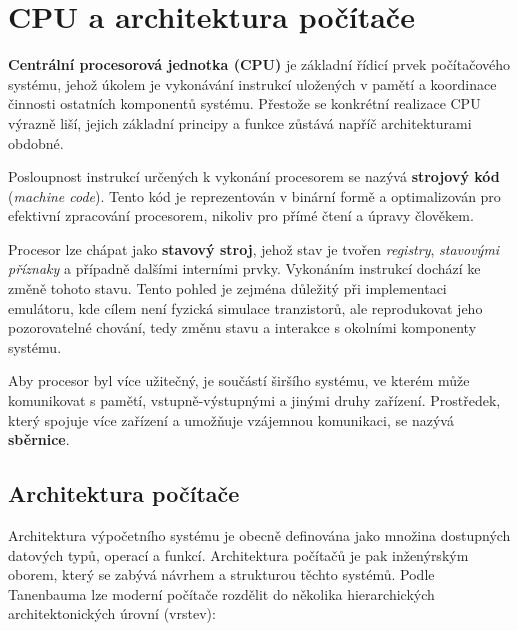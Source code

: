 \chapter{CPU a architektura počítače}

\textbf{Centrální procesorová jednotka (CPU)} je základní řídicí prvek počítačového systému, jehož
úkolem je vykonávání instrukcí uložených v pamětí a koordinace činnosti ostatních komponentů systému.
Přestože se konkrétní realizace CPU výrazně liší, jejich základní principy a funkce zůstává napříč
architekturami obdobné.

Posloupnost instrukcí určených k vykonání procesorem se nazývá \textbf{strojový kód}
(\textit{machine code}). Tento kód je reprezentován v binární formě a optimalizován pro efektivní
zpracování procesorem, nikoliv pro přímé čtení a úpravy člověkem.

Procesor lze chápat jako \textbf{stavový stroj}, jehož stav je tvořen \emph{registry}, \emph{stavovými
příznaky} a případně dalšími interními prvky. Vykonáním instrukcí dochází ke změně tohoto stavu.
Tento pohled je zejména důležitý při implementaci emulátoru, kde cílem není fyzická simulace
tranzistorů, ale reprodukovat jeho pozorovatelné chování, tedy změnu stavu a interakce s okolními
komponenty systému.

Aby procesor byl více užitečný, je součástí širšího systému, ve kterém může komunikovat s pamětí,
vstupně-výstupnými a jinými druhy zařízení. Prostředek, který spojuje více zařízení a umožňuje
vzájemnou komunikaci, se nazývá \textbf{sběrnice}.

\label{sec:tp-architecture}
\section{Architektura počítače}

Architektura výpočetního systému je obecně definována jako množina dostupných datových typů, operací
a funkcí. Architektura počítačů je pak inženýrským oborem, který se zabývá návrhem a strukturou
těchto systémů. Podle Tanenbauma \cite{tanenbaum} lze moderní počítače rozdělit do několika
hierarchických architektonických úrovní (vrstev):

